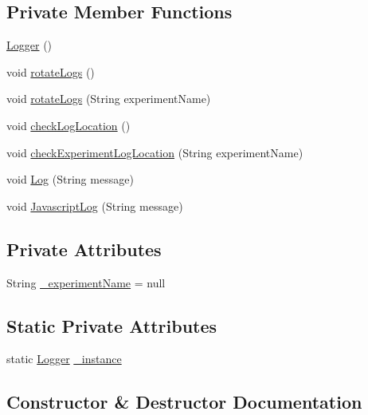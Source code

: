 \subsection*{Private Member Functions}
\begin{DoxyCompactItemize}
\item 
\hyperlink{class_web_analyzer_1_1_util_1_1_logger_aa8818c2a85be10d6ba6df1b6bdc7761c}{Logger} ()
\item 
void \hyperlink{class_web_analyzer_1_1_util_1_1_logger_a468f8bcd52d2597c66ab1ca6a3a26147}{rotate\+Logs} ()
\item 
void \hyperlink{class_web_analyzer_1_1_util_1_1_logger_a834e07e3258fe8ff3b1a8b7a3c361862}{rotate\+Logs} (String experiment\+Name)
\item 
void \hyperlink{class_web_analyzer_1_1_util_1_1_logger_a2c1e81bccf2002bf43528787198f7c93}{check\+Log\+Location} ()
\item 
void \hyperlink{class_web_analyzer_1_1_util_1_1_logger_aa043e76883528fa0010f6809be07426a}{check\+Experiment\+Log\+Location} (String experiment\+Name)
\item 
void \hyperlink{class_web_analyzer_1_1_util_1_1_logger_a8330043b579da4a0112b4694b634516f}{Log} (String message)
\item 
void \hyperlink{class_web_analyzer_1_1_util_1_1_logger_ab9c037396c9c5ab28aac4a9304ef1461}{Javascript\+Log} (String message)
\end{DoxyCompactItemize}
\subsection*{Private Attributes}
\begin{DoxyCompactItemize}
\item 
String \hyperlink{class_web_analyzer_1_1_util_1_1_logger_abf60192ad5104e885eb651bfd8f5eb78}{\+\_\+experiment\+Name} = null
\end{DoxyCompactItemize}
\subsection*{Static Private Attributes}
\begin{DoxyCompactItemize}
\item 
static \hyperlink{class_web_analyzer_1_1_util_1_1_logger}{Logger} \hyperlink{class_web_analyzer_1_1_util_1_1_logger_a8543413dc13f3636a0c3a717d75ed6b0}{\+\_\+instance}
\end{DoxyCompactItemize}


\subsection{Constructor \& Destructor Documentation}
\hypertarget{class_web_analyzer_1_1_util_1_1_logger_aa8818c2a85be10d6ba6df1b6bdc7761c}{}
